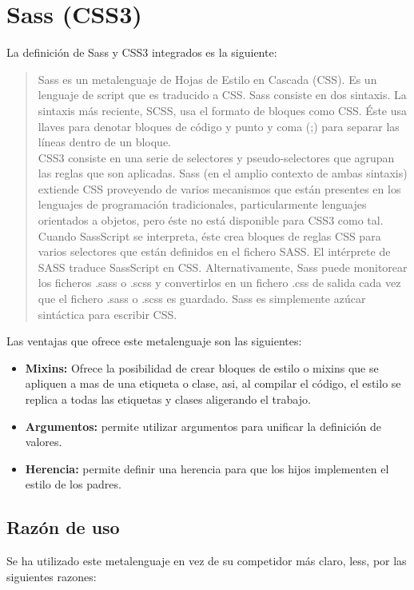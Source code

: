 
\section{Sass (CSS3)}
La definición de Sass y CSS3 integrados es la siguiente:

\begin{quote}
	Sass es un metalenguaje de Hojas de Estilo en Cascada (CSS). Es un lenguaje de script que es traducido a CSS. Sass consiste en dos sintaxis. La sintaxis más reciente, SCSS, usa el formato de bloques como CSS. Éste usa llaves para denotar bloques de código y punto y coma (;) para separar las líneas dentro de un bloque.\\
	
	CSS3 consiste en una serie de selectores y pseudo-selectores que agrupan las reglas que son aplicadas. Sass (en el amplio contexto de ambas sintaxis) extiende CSS proveyendo de varios mecanismos que están presentes en los lenguajes de programación tradicionales, particularmente lenguajes orientados a objetos, pero éste no está disponible para CSS3 como tal. Cuando SassScript se interpreta, éste crea bloques de reglas CSS para varios selectores que están definidos en el fichero SASS. El intérprete de SASS traduce SassScript en CSS. Alternativamente, Sass puede monitorear los ficheros .sass o .scss y convertirlos en un fichero .css de salida cada vez que el fichero .sass o .scss es guardado. Sass es simplemente azúcar sintáctica para escribir CSS.
\end{quote}

Las ventajas que ofrece este metalenguaje son las siguientes:

\begin{itemize}
	\item \textbf{Mixins:} Ofrece la posibilidad de crear bloques de estilo o mixins que se apliquen a mas de una etiqueta o clase, asi, al compilar el código, el estilo se replica a todas las etiquetas y clases aligerando el trabajo.
	\item \textbf{Argumentos:} permite utilizar argumentos para unificar la definición de valores.
	\item \textbf{Herencia:} permite definir una herencia para que los hijos implementen el estilo de los padres. 
\end{itemize}

\subsection{Razón de uso}
Se ha utilizado este metalenguaje en vez de su competidor más claro, less, por las siguientes razones:

